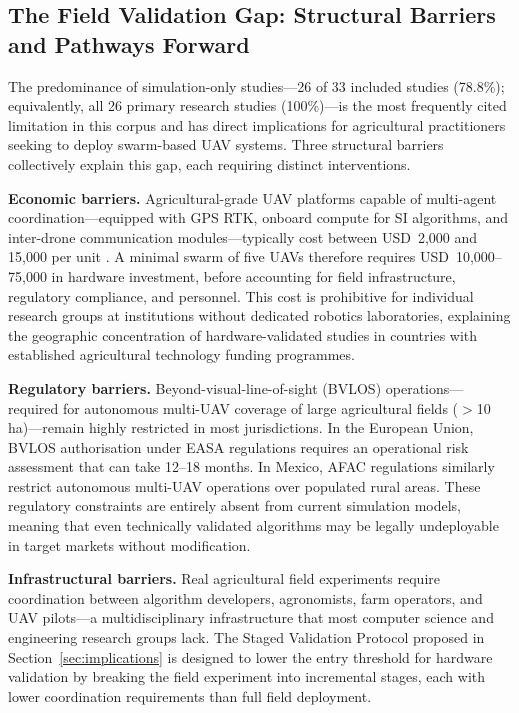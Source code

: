 \documentclass[review,3p,times]{elsarticle}
\begin{document}
\subsection{The Field Validation Gap: Structural Barriers and Pathways Forward}

The predominance of simulation-only studies---26 of 33 included studies (78.8\%); equivalently, all 26 primary research studies (100\%)---is the most frequently cited limitation in this corpus and has direct implications for agricultural practitioners seeking to deploy swarm-based UAV systems. Three structural barriers collectively explain this gap, each requiring distinct interventions.

\textbf{Economic barriers.} Agricultural-grade UAV platforms capable of multi-agent coordination---equipped with GPS RTK, onboard compute for SI algorithms, and inter-drone communication modules---typically cost between USD~2{,}000 and 15{,}000 per unit \cite{phung2021}. A minimal swarm of five UAVs therefore requires USD~10{,}000--75{,}000 in hardware investment, before accounting for field infrastructure, regulatory compliance, and personnel. This cost is prohibitive for individual research groups at institutions without dedicated robotics laboratories, explaining the geographic concentration of hardware-validated studies in countries with established agricultural technology funding programmes.

\textbf{Regulatory barriers.} Beyond-visual-line-of-sight (BVLOS) operations---required for autonomous multi-UAV coverage of large agricultural fields ($>$10\,ha)---remain highly restricted in most jurisdictions. In the European Union, BVLOS authorisation under EASA regulations requires an operational risk assessment that can take 12--18 months. In Mexico, AFAC regulations similarly restrict autonomous multi-UAV operations over populated rural areas. These regulatory constraints are entirely absent from current simulation models, meaning that even technically validated algorithms may be legally undeployable in target markets without modification.

\textbf{Infrastructural barriers.} Real agricultural field experiments require coordination between algorithm developers, agronomists, farm operators, and UAV pilots---a multidisciplinary infrastructure that most computer science and engineering research groups lack. The Staged Validation Protocol proposed in Section~\ref{sec:implications} is designed to lower the entry threshold for hardware validation by breaking the field experiment into incremental stages, each with lower coordination requirements than full field deployment.
\end{document}
